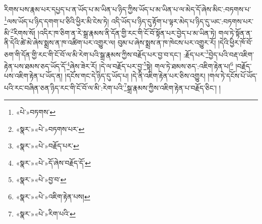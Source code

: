 རིགས་པས་རྣམ་པར་དཔྱད་པ་ན་ཡོད་པ་མ་ཡིན་པ་ཉིད་ཀྱིས་ཡོད་པ་མ་ཡིན་པ་ལ་མེད་དོ་ཞེས་མིང་:བཏགས་པ་\footnote{«པེ་»བཏགས་}ལས་ཡོད་པ་ཉིད་དགག་པ་ཅིའི་ཕྱིར་མི་ངེས་ཏེ། འདི་ཡོད་པ་ཉིད་དུ་རྟོག་པ་ལྟར་མེད་པ་ཉིད་དུ་ཡང་:བཏགས་པར་མི་\footnote{«སྣར་»«པེ་»བཏགས་པར་}རིགས་སོ། །འདིར་ཁ་ཅིག་ན་རེ་སྒྲ་རྣམས་ནི་དོན་གྱི་རང་གི་ངོ་བོ་སྟོན་པར་བྱེད་པ་མ་ཡིན་ཏེ། གལ་ཏེ་སྟོན་ན་ནི་དེའི་ཚེ་མེ་ཞེས་སྨྲས་ན་ཁ་འཚིག་པར་འགྱུར་ལ། བུམ་པ་ཞེས་སྨྲས་ན་ཁ་ཁེངས་པར་འགྱུར་རོ། །དེའི་ཕྱིར་ཁོ་བོ་ཅག་གི་དོན་གྱི་རང་གི་ངོ་བོ་ལ་མི་རེག་པའི་སྒྲ་རྣམས་ཀྱིས་བརྗོད་པར་བྱ་བ་དང་། :རྗོད་པར་\footnote{«སྣར་»«པེ་»བརྗོད་པར་}བྱེད་པའི་བརྡ་འཇིག་རྟེན་པས་ཐམས་ཅད་ཡོད་དོ་\footnote{«སྣར་»«པེ་»དོ་ཞེས་བརྗོད་དོ་}ཞེས་ཟེར་རོ། །དེ་ལ་བརྗོད་པར་བྱ་\footnote{«སྣར་»«པེ་»བྱ་བ་}སྟེ། གལ་ཏེ་ཐམས་ཅད་:འཇིག་རྟེན་པ།\footnote{«སྣར་»«པེ་»འཇིག་རྟེན་པས།} །བརྗོད་པས་འཇིག་རྟེན་པ་ཡོད་ན། །དངོས་གང་དེ་ཉིད་དུ་ཡོད་པ། །དེ་ནི་འཇིག་རྟེན་པར་ཅིས་འགྱུར། །གལ་ཏེ་དངོས་པོ་ཡོད་པའི་རང་བཞིན་ཅན་ཉིད་རང་གི་ངོ་བོ་ལ་མི་:རེག་པའི་\footnote{«སྣར་»«པེ་»རིག་པའི་}སྒྲ་རྣམས་ཀྱིས་འཇིག་རྟེན་པ་བརྗོད་ཅིང་། །
